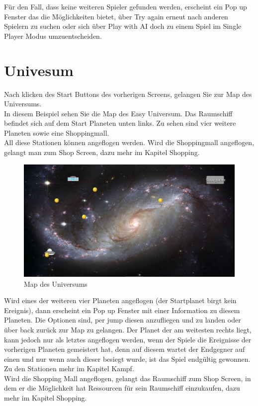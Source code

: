 \documentclass[fontsize=12pt,paper=a4,twoside]{scrartcl}
\begin{document}
Für den Fall, dass keine weiteren Spieler gefunden werden, erscheint ein Pop up Fenster das die Möglichkeiten bietet, über Try again erneut nach anderen Spielern zu suchen
oder sich über Play with AI doch zu einem Spiel im Single Player Modus umzuentscheiden.\\
 
\newpage
\section{Univesum}

Nach klicken des Start Buttons des vorherigen Screens, gelangen Sie zur Map des Universums.\\
In diesem Beispiel sehen Sie die Map des Easy Universum. Das Raumschiff befindet sich auf dem Start Planeten unten links. Zu sehen sind vier weitere Planeten sowie eine Shoppingmall.\\
All diese Stationen können angeflogen werden. Wird die Shoppingmall angeflogen, gelangt man zum Shop Screen, dazu mehr im Kapitel Shopping.\\
\begin{figure}[htp]
	\centering
	\includegraphics[width=1.00\linewidth]{pics/universeEasyP1.png}
	\caption{Map des Universums}
	\label{fig1}
\end{figure}

Wird eines der weiteren vier Planeten angeflogen (der Startplanet birgt kein Ereignis), dann erscheint ein
Pop up Fenster mit einer Information zu diesem Planeten. Die Optionen sind, per jump diesen anzufliegen und zu landen oder über back zurück zur Map zu gelangen. Der Planet der am weitesten rechts liegt, kann jedoch nur als letztes angeflogen werden, wenn der Spiele die Ereignisse der vorherigen Planeten gemeistert hat, denn auf diesem wartet der Endgegner auf einen und nur wenn auch dieser besiegt wurde, ist das Spiel endgültig gewonnen. Zu den Stationen mehr im Kapitel Kampf.\\
Wird die Shopping Mall angeflogen, gelangt das Raumschiff zum Shop Screen, in dem er die Möglichkeit hat Ressourcen für sein Raumschiff einzukaufen, dazu mehr im Kapitel Shopping.\\
\end{document}

